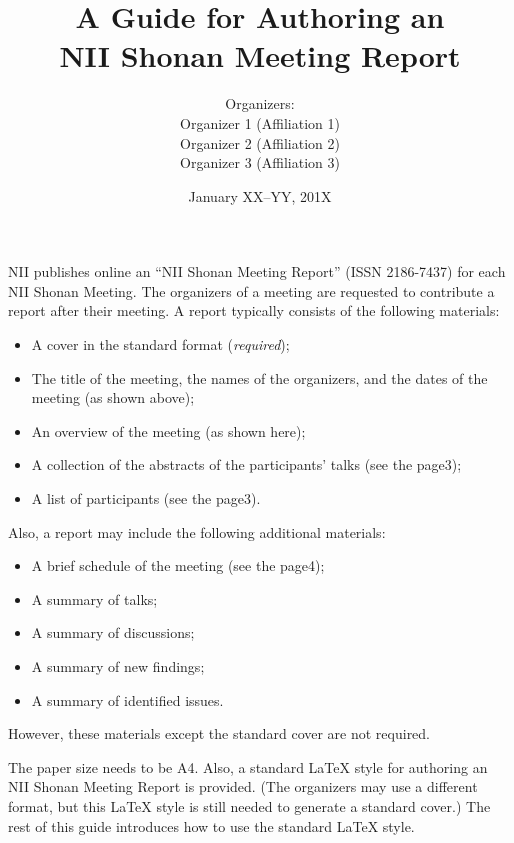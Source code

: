 \documentclass[a4paper]{article}
\begin{document}
\SHONANmakecover

\title{A Guide for Authoring an\\ NII Shonan Meeting Report}
\author{Organizers:\\
Organizer 1 (Affiliation 1)\\
Organizer 2 (Affiliation 2)\\
Organizer 3 (Affiliation 3)}
\date{January XX--YY, 201X}
\maketitle

NII publishes online an ``NII Shonan Meeting Report'' (ISSN 2186-7437)
for each NII Shonan Meeting.  The organizers of a meeting are
requested to contribute a report after their meeting.  A report
typically consists of the following materials:
\begin{itemize}
\item A cover in the standard format ({\em required\/});
\item The title of the meeting, the names of the organizers, and the
dates of the meeting (as shown above);
\item An overview of the meeting (as shown here);
\item A collection of the abstracts of the participants' talks (see
the page3);
\item A list of participants (see the page3).
\end{itemize}
Also, a report may include the following additional materials:
\begin{itemize}
\item A brief schedule of the meeting (see the page4);
\item A summary of talks;
\item A summary of discussions;
\item A summary of new findings;
\item A summary of identified issues.
\end{itemize}
However, these materials except the standard cover are not required.

The paper size needs to be A4.  Also, a standard \LaTeX{} style for
authoring an NII Shonan Meeting Report is provided.  (The organizers
may use a different format, but this \LaTeX{} style is still needed to
generate a standard cover.)  The rest of this guide introduces how to
use the standard \LaTeX{} style.
\end{document}
